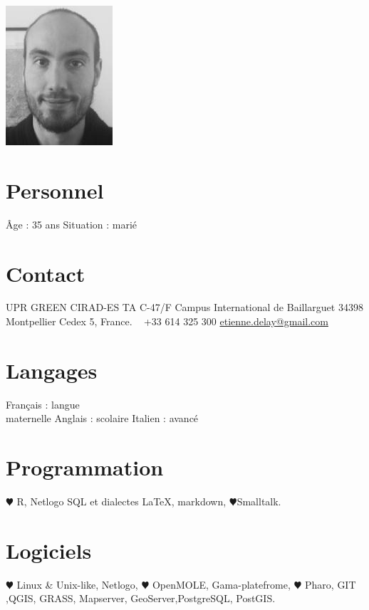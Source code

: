 \documentclass[]{cv-etienne}
\begin{document}

\begin{aside} %
  \includegraphics{img/delay_s}
  \section{Personnel}
  Âge : 35 ans
  Situation : marié
  \section{Contact}
  UPR GREEN
  CIRAD-ES
  TA C-47/F
  Campus International de Baillarguet
  34398 Montpellier Cedex 5, France.
  ~
  +33 614 325 300
  \href{mailto:etienne.delay@gmail.com}{\footnotesize etienne.delay@gmail.com}
  ~
  \section{Langages}
  Français : langue\\ maternelle
  Anglais : scolaire
  Italien : avancé
  \section{Programmation}
  {\color{red} $\varheartsuit$} R, Netlogo
  SQL et dialectes
  \LaTeX, markdown,
  {\color{red} $\varheartsuit$}Smalltalk.
  \section{Logiciels}
  {\color{red} $\varheartsuit$} Linux \& Unix-like,
  Netlogo, {\color{red} $\varheartsuit$} OpenMOLE,
  Gama-platefrome,
  {\color{red} $\varheartsuit$} Pharo, GIT ,QGIS,
  GRASS, Mapserver, GeoServer,PostgreSQL, PostGIS.
\end{aside}
\end{document}
